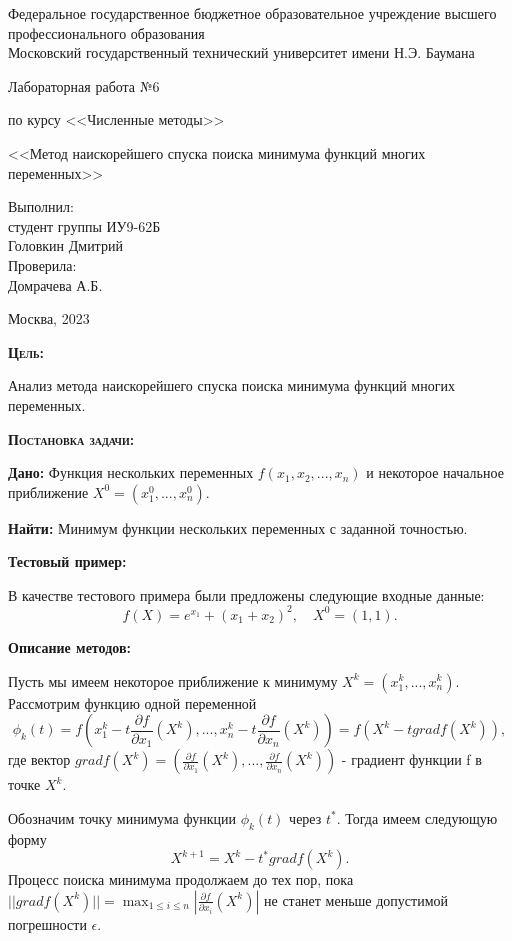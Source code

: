 \documentclass [12pt]{article}
\title{}
\date{}
\author{}
\begin{document}
\begin{titlepage}
\thispagestyle{empty}
\begin{center}
Федеральное государственное бюджетное образовательное учреждение высшего профессионального образования \\Московский государственный технический университет имени Н.Э. Баумана

\end{center}
\vfill
\centerline{\large{Лабораторная работа №6}}
\centerline{\large{по курсу <<Численные методы>>}}
\centerline{\large{<<Метод наискорейшего спуска поиска минимума функций многих переменных>>}}
\vfill
\hfill\parbox{5cm} {
           Выполнил:\\
           студент группы ИУ9-62Б \hfill \\
           Головкин Дмитрий\hfill \medskip\\
           Проверила:\\
           Домрачева А.Б.\hfill
       }
\centerline{Москва, 2023}
\clearpage
\end{titlepage}

\textsc{\textbf{Цель:}} 

Анализ метода наискорейшего спуска поиска минимума функций многих переменных.

\textsc{\textbf{Постановка задачи:}} 

\textbf{Дано:}  Функция нескольких переменных $ f(x_{1}, x_{2}, ...,x_{n}) $ и некоторое начальное приближение $ X^{0} = (x_{1}^{0}, ..., x_{n}^{0}). $

\textbf{Найти:} Минимум функции нескольких переменных с заданной точностью.

\textbf{Тестовый пример:} 

В качестве тестового примера были предложены следующие входные данные: $$ f(X) = e^{x_{1}} + (x_{1} + x_{2})^{2}, \quad X^{0} = (1,1) .$$

\textbf{Описание методов:}

Пусть мы имеем некоторое приближение к минимуму $X^{k} = (x_{1}^{k},...,x_{n}^{k})$. Рассмотрим функцию одной переменной $$ \phi_{k}(t) = f(x_{1}^k - t\frac{\partial f}{\partial x_{1}}(X^{k}),...,x_{n}^k - t\frac{\partial f}{\partial x_{n}}(X^{k})) = f(X^{k} - tgradf(X^{k})), $$ где вектор $ gradf(X^{k}) = (\frac{\partial f}{\partial x_{1}}(X^{k}),...,\frac{\partial f}{\partial x_{n}}(X^{k}) ) $ - градиент  функции f в точке $ X^{k}$. 

Обозначим точку минимума функции $\phi_{k}(t)$ через $t^{*}$. Тогда имеем следующую форму $$ X^{k+1} = X^{k} - t^{*}gradf(X^{k}) .$$
Процесс поиска минимума продолжаем до тех пор, пока $||gradf(X^{k})|| = \max_{1 \leq i \leq n} |\frac{\partial f}{\partial x_{i}}(X^{k})|$ не станет меньше допустимой погрешности $\epsilon$.
\end{document}
